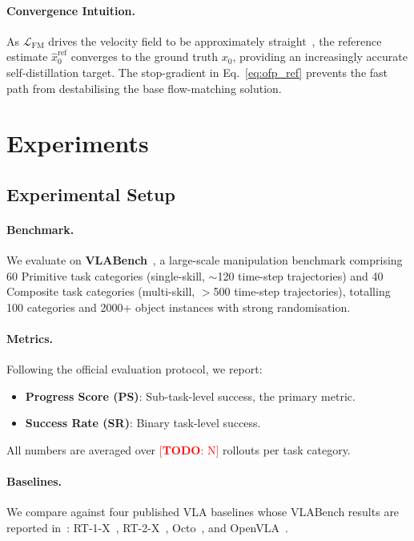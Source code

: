 \documentclass[10pt,twocolumn]{article}
\newcommand{\TODO}[1]{\textcolor{red}{[\textbf{TODO}: #1]}}
\begin{document}
\paragraph{Convergence Intuition.}
As $\mathcal{L}_{\mathrm{FM}}$ drives the velocity field to be approximately
straight~\cite{lipman2022flow}, the reference estimate $\hat{x}_0^{\mathrm{ref}}$
converges to the ground truth $x_0$, providing an increasingly accurate
self-distillation target. The stop-gradient in Eq.~\eqref{eq:ofp_ref}
prevents the fast path from destabilising the base flow-matching solution.


\section{Experiments}
\label{sec:exp}

\subsection{Experimental Setup}
\label{sec:exp:setup}

\paragraph{Benchmark.}
We evaluate on \textbf{VLABench}~\cite{zhang2024vlabench}, a large-scale
manipulation benchmark comprising 60 Primitive task categories
(single-skill, $\sim$120 time-step trajectories) and 40 Composite task
categories (multi-skill, $>$500 time-step trajectories), totalling 100
categories and 2000+ object instances with strong randomisation.

\paragraph{Metrics.}
Following the official evaluation protocol, we report:
\begin{itemize}
  \item \textbf{Progress Score (PS)}: Sub-task-level success, the primary metric.
  \item \textbf{Success Rate (SR)}: Binary task-level success.
\end{itemize}
All numbers are averaged over \TODO{N} rollouts per task category.

\paragraph{Baselines.}
We compare against four published VLA baselines whose VLABench results are
reported in~\cite{zhang2024vlabench}:
RT-1-X~\cite{brohan2022rt1},
RT-2-X~\cite{brohan2023rt2},
Octo~\cite{team2024octo}, and
OpenVLA~\cite{kim2024openvla}.
\end{document}
